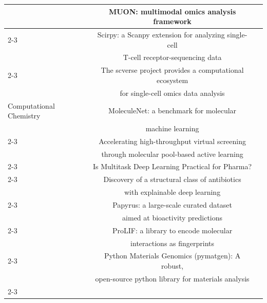 \begin{table}[ht]
\begin{tabular}{lcc}
 & MUON: multimodal omics analysis framework & \citet{Bredikhin2022} \\
\cmidrule(lr){2-3}

 & Scirpy: a Scanpy extension for analyzing single-cell & \multirow{2}{*}{\citet{10.1093/bioinformatics/btaa611}} \\
 &  T-cell receptor-sequencing data & \\
\cmidrule(lr){2-3}

 & The scverse project provides a computational ecosystem & \multirow{2}{*}{\citet{Virshup2023}} \\
 & for single-cell omics data analysis & \\

\midrule

\multirow{28.5}{*}{Computational Chemistry} & MoleculeNet: a benchmark for molecular & \multirow{2}{*}{\citet{MoleculeNet}} \\
 & machine learning & \\
\cmidrule(lr){2-3}

 & Accelerating high-throughput virtual screening & \multirow{2}{*}{\citet{graff_accelerating_2021}} \\
 & through molecular pool-based active learning & \\
\cmidrule(lr){2-3}

 & Is Multitask Deep Learning Practical for Pharma? & \citet{doi:10.1021/acs.jcim.7b00146} \\
\cmidrule(lr){2-3}

 & Discovery of a structural class of antibiotics & \multirow{2}{*}{\citet{Wong2024}} \\
 & with explainable deep learning & \\
\cmidrule(lr){2-3}

 & Papyrus: a large-scale curated dataset & \multirow{2}{*}{\citet{Béquignon2023}} \\
 & aimed at bioactivity predictions & \\
\cmidrule(lr){2-3}

 & ProLIF: a library to encode molecular & \multirow{2}{*}{\citet{Bouysset_ProLIF_a_library_2021}} \\
 & interactions as fingerprints & \\
\cmidrule(lr){2-3}

 & Python Materials Genomics (pymatgen): A robust, & \multirow{2}{*}{\citet{ONG2013314}} \\
 & open-source python library for materials analysis & \\
\cmidrule(lr){2-3}


\end{tabular}
\end{table}
